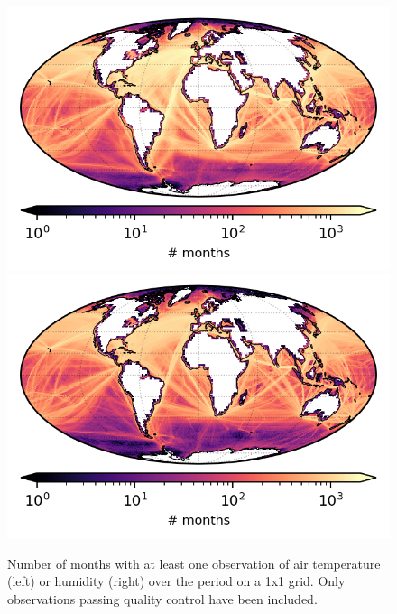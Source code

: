 \begin{figure}[h]
    \centering
    \includegraphics{resources/observations-at-months-map-optimal.png}
    \includegraphics{resources/observations-dpt-months-map-optimal.png}
    \caption{Number of months with at least one observation of air temperature (left) or humidity (right) over the period \datatimerange{} on a 1x1 grid. Only observations passing quality control have been included.\\}
    \label{fig:at-nmonths-map}
\end{figure}

\FloatBarrier
